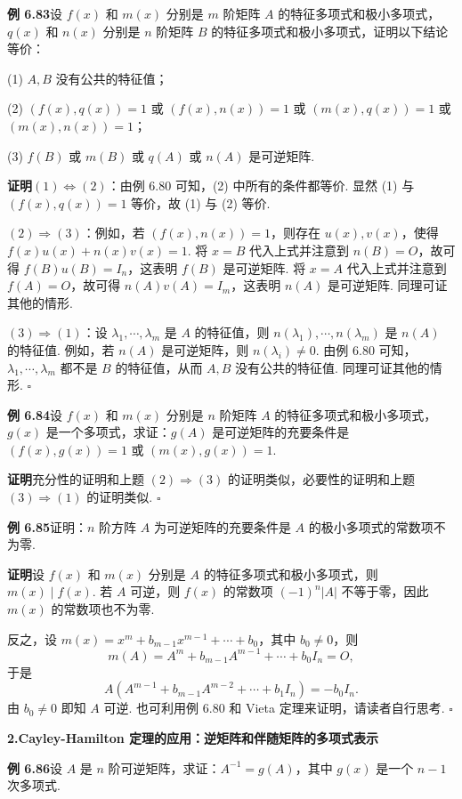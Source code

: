 \documentclass[UTF8, 12pt, fontset=fandol, oneside]{ctexart}
\begin{document}
\noindent\textbf{例 6.83}\quad 设 $f(x)$ 和 $m(x)$ 分别是 $m$ 阶矩阵 $A$ 的特征多项式和极小多项式，$q(x)$ 和 $n(x)$ 分别是 $n$ 阶矩阵 $B$ 的特征多项式和极小多项式，证明以下结论等价：

(1) $A,B$ 没有公共的特征值；

(2) $(f(x),q(x))=1$ 或 $(f(x),n(x))=1$ 或 $(m(x),q(x))=1$ 或 $(m(x),n(x))=1$；

(3) $f(B)$ 或 $m(B)$ 或 $q(A)$ 或 $n(A)$ 是可逆矩阵.

\noindent\textbf{证明}\quad $(1)\Leftrightarrow(2)$：由例 6.80 可知，(2) 中所有的条件都等价. 显然 (1) 与 $(f(x),q(x))=1$ 等价，故 (1) 与 (2) 等价.

$(2)\Rightarrow(3)$：例如，若 $(f(x),n(x))=1$，则存在 $u(x),v(x)$，使得 $f(x)u(x)+n(x)v(x)=1$. 将 $x=B$ 代入上式并注意到 $n(B)=O$，故可得 $f(B)u(B)=I_n$，这表明 $f(B)$ 是可逆矩阵. 将 $x=A$ 代入上式并注意到 $f(A)=O$，故可得 $n(A)v(A)=I_m$，这表明 $n(A)$ 是可逆矩阵. 同理可证其他的情形.

$(3)\Rightarrow(1)$：设 $\lambda_1,\cdots,\lambda_m$ 是 $A$ 的特征值，则 $n(\lambda_1),\cdots,n(\lambda_m)$ 是 $n(A)$ 的特征值. 例如，若 $n(A)$ 是可逆矩阵，则 $n(\lambda_i)\ne 0$. 由例 6.80 可知，$\lambda_1,\cdots,\lambda_m$ 都不是 $B$ 的特征值，从而 $A,B$ 没有公共的特征值. 同理可证其他的情形. $\square$

\noindent\textbf{例 6.84}\quad 设 $f(x)$ 和 $m(x)$ 分别是 $n$ 阶矩阵 $A$ 的特征多项式和极小多项式，$g(x)$ 是一个多项式，求证：$g(A)$ 是可逆矩阵的充要条件是 $(f(x),g(x))=1$ 或 $(m(x),g(x))=1$.

\noindent\textbf{证明}\quad 充分性的证明和上题 $(2)\Rightarrow(3)$ 的证明类似，必要性的证明和上题 $(3)\Rightarrow(1)$ 的证明类似. $\square$

\noindent\textbf{例 6.85}\quad 证明：$n$ 阶方阵 $A$ 为可逆矩阵的充要条件是 $A$ 的极小多项式的常数项不为零.

\noindent\textbf{证明}\quad 设 $f(x)$ 和 $m(x)$ 分别是 $A$ 的特征多项式和极小多项式，则 $m(x)\mid f(x)$. 若 $A$ 可逆，则 $f(x)$ 的常数项 $(-1)^n|A|$ 不等于零，因此 $m(x)$ 的常数项也不为零.

反之，设 $m(x)=x^m+b_{m-1}x^{m-1}+\cdots+b_0$，其中 $b_0\ne 0$，则
\[
m(A)=A^m+b_{m-1}A^{m-1}+\cdots+b_0I_n=O,
\]
于是
\[
A(A^{m-1}+b_{m-1}A^{m-2}+\cdots+b_1I_n)=-b_0I_n.
\]
由 $b_0\ne 0$ 即知 $A$ 可逆. 也可利用例 6.80 和 Vieta 定理来证明，请读者自行思考. $\square$

\noindent\textbf{2.\quad Cayley-Hamilton 定理的应用：逆矩阵和伴随矩阵的多项式表示}

\noindent\textbf{例 6.86}\quad 设 $A$ 是 $n$ 阶可逆矩阵，求证：$A^{-1}=g(A)$，其中 $g(x)$ 是一个 $n-1$ 次多项式.
\end{document}
